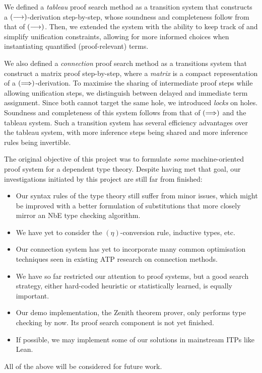 \documentclass[twoside]{report}
\begin{document}
We defined a \emph{tableau} proof search method as a transition system that constructs a $(\longrightarrow)$-derivation step-by-step, whose soundness and completeness follow from that of $(\longrightarrow)$. Then, we extended the system with the ability to keep track of and simplify unification constraints, allowing for more informed choices when instantiating quantified (proof-relevant) terms.

We also defined a \emph{connection} proof search method as a transitions system that construct a matrix proof step-by-step, where a \emph{matrix} is a compact representation of a $(\Longrightarrow)$-derivation. To maximise the sharing of intermediate proof steps while allowing unification steps, we distinguish between delayed and immediate term assignment. Since both cannot target the same hole, we introduced \emph{locks} on holes. Soundness and completeness of this system follows from that of $(\Longrightarrow)$ and the tableau system. Such a transition system has several efficiency advantages over the tableau system, with more inference steps being shared and more inference rules being invertible.

The original objective of this project was to formulate \emph{some} machine-oriented proof system for a dependent type theory. Despite having met that goal, our investigations initiated by this project are still far from finished:

\begin{itemize}
    \item Our syntax rules of the type theory still suffer from minor issues, which might be improved with a better formulation of substitutions that more closely mirror an NbE type checking algorithm.

    \item We have yet to consider the $(\eta)$-conversion rule, inductive types, etc.

    \item Our connection system has yet to incorporate many common optimisation techniques seen in existing ATP research on connection methods.

    \item We have so far restricted our attention to proof systems, but a good search strategy, either hard-coded heuristic or statistically learned, is equally important.

    \item Our demo implementation, the Zenith theorem prover, only performs type checking by now. Its proof search component is not yet finished.

    \item If possible, we may implement some of our solutions in mainstream ITPs like Lean.
\end{itemize}

All of the above will be considered for future work.



\end{document}
